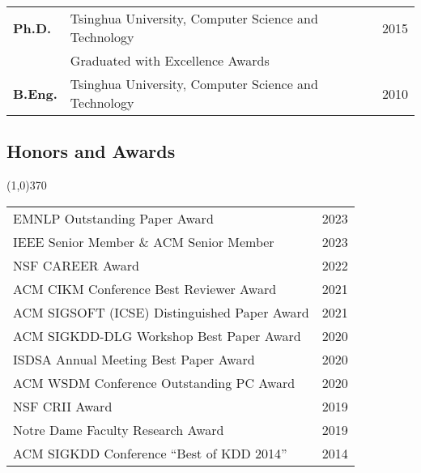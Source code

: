 \documentclass[10pt]{article}
\begin{document}
\begin{table}[h!]
\begin{tabular*}{12.7cm}{p{1.15cm}p{10.00cm}r}
\bf{Ph.D.}&Tsinghua University, Computer Science and Technology&2015\\
&\multicolumn{2}{l}{Graduated with Excellence Awards} \\ %
\bf{B.Eng.}&Tsinghua University, Computer Science and Technology&2010

\end{tabular*}
\end{table}

\vspace{-0.6cm}
\subsection{\sc Honors and Awards}
\vspace{-0.4cm} \line(1,0){370} \vspace{-0.1cm}

\begin{table}[h!]
\begin{tabular*}{12.7cm}{p{11.65cm}r}
EMNLP Outstanding Paper Award & 2023 \\
IEEE Senior Member \& ACM Senior Member & 2023 \\
NSF CAREER Award & 2022 \\
ACM CIKM Conference Best Reviewer Award & 2021 \\	
ACM SIGSOFT (ICSE) Distinguished Paper Award & 2021 \\
ACM SIGKDD-DLG Workshop Best Paper Award & 2020 \\
ISDSA Annual Meeting Best Paper Award & 2020 \\
ACM WSDM Conference Outstanding PC Award & 2020 \\
NSF CRII Award & 2019 \\
Notre Dame Faculty Research Award & 2019 \\
ACM SIGKDD Conference ``Best of KDD 2014'' & 2014 \\
\end{tabular*}
\end{table}

\vspace{-0.6cm}
\end{document}
